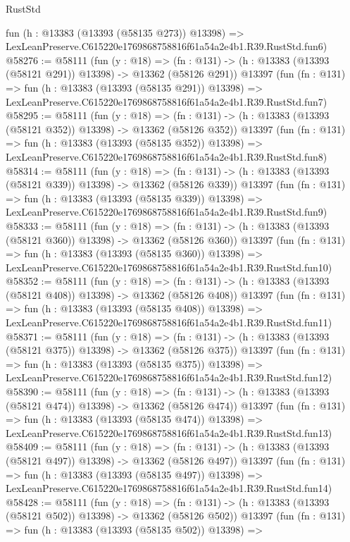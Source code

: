 \begin{lexlean}{RustStd}
\begin{coremodule}
    fun (h : @13383 (@13393 (@58135 @273)) @13398) =>
    LexLeanPreserve.C615220e1769868758816f61a54a2e4b1.R39.RustStd.fun6)
@58276 := @58111
    (fun (y : @18) =>
    (fn : @131) -> (h : @13383 (@13393 (@58121 @291)) @13398) -> @13362 (@58126 @291))
    @13397
    (fun (fn : @131) =>
    fun (h : @13383 (@13393 (@58135 @291)) @13398) =>
    LexLeanPreserve.C615220e1769868758816f61a54a2e4b1.R39.RustStd.fun7)
@58295 := @58111
    (fun (y : @18) =>
    (fn : @131) -> (h : @13383 (@13393 (@58121 @352)) @13398) -> @13362 (@58126 @352))
    @13397
    (fun (fn : @131) =>
    fun (h : @13383 (@13393 (@58135 @352)) @13398) =>
    LexLeanPreserve.C615220e1769868758816f61a54a2e4b1.R39.RustStd.fun8)
@58314 := @58111
    (fun (y : @18) =>
    (fn : @131) -> (h : @13383 (@13393 (@58121 @339)) @13398) -> @13362 (@58126 @339))
    @13397
    (fun (fn : @131) =>
    fun (h : @13383 (@13393 (@58135 @339)) @13398) =>
    LexLeanPreserve.C615220e1769868758816f61a54a2e4b1.R39.RustStd.fun9)
@58333 := @58111
    (fun (y : @18) =>
    (fn : @131) -> (h : @13383 (@13393 (@58121 @360)) @13398) -> @13362 (@58126 @360))
    @13397
    (fun (fn : @131) =>
    fun (h : @13383 (@13393 (@58135 @360)) @13398) =>
    LexLeanPreserve.C615220e1769868758816f61a54a2e4b1.R39.RustStd.fun10)
@58352 := @58111
    (fun (y : @18) =>
    (fn : @131) -> (h : @13383 (@13393 (@58121 @408)) @13398) -> @13362 (@58126 @408))
    @13397
    (fun (fn : @131) =>
    fun (h : @13383 (@13393 (@58135 @408)) @13398) =>
    LexLeanPreserve.C615220e1769868758816f61a54a2e4b1.R39.RustStd.fun11)
@58371 := @58111
    (fun (y : @18) =>
    (fn : @131) -> (h : @13383 (@13393 (@58121 @375)) @13398) -> @13362 (@58126 @375))
    @13397
    (fun (fn : @131) =>
    fun (h : @13383 (@13393 (@58135 @375)) @13398) =>
    LexLeanPreserve.C615220e1769868758816f61a54a2e4b1.R39.RustStd.fun12)
@58390 := @58111
    (fun (y : @18) =>
    (fn : @131) -> (h : @13383 (@13393 (@58121 @474)) @13398) -> @13362 (@58126 @474))
    @13397
    (fun (fn : @131) =>
    fun (h : @13383 (@13393 (@58135 @474)) @13398) =>
    LexLeanPreserve.C615220e1769868758816f61a54a2e4b1.R39.RustStd.fun13)
@58409 := @58111
    (fun (y : @18) =>
    (fn : @131) -> (h : @13383 (@13393 (@58121 @497)) @13398) -> @13362 (@58126 @497))
    @13397
    (fun (fn : @131) =>
    fun (h : @13383 (@13393 (@58135 @497)) @13398) =>
    LexLeanPreserve.C615220e1769868758816f61a54a2e4b1.R39.RustStd.fun14)
@58428 := @58111
    (fun (y : @18) =>
    (fn : @131) -> (h : @13383 (@13393 (@58121 @502)) @13398) -> @13362 (@58126 @502))
    @13397
    (fun (fn : @131) =>
    fun (h : @13383 (@13393 (@58135 @502)) @13398) =>

\end{coremodule}
\end{lexlean}
